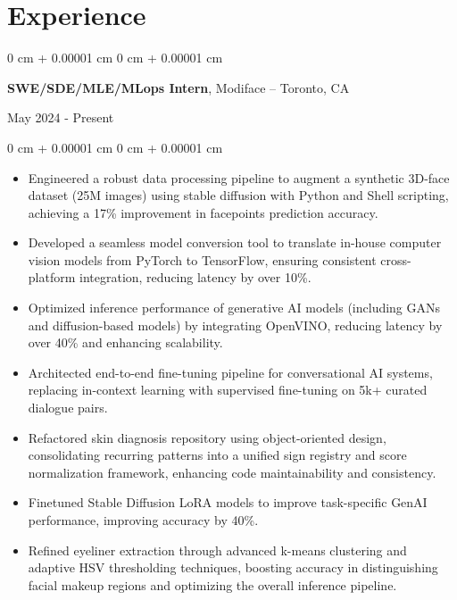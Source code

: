 \documentclass[10pt, letterpaper]{article}
\newenvironment{highlights}{
    \begin{itemize}[
        topsep=0.08 cm,
        parsep=0.08 cm,
        partopsep=0pt,
        itemsep=0pt,
        leftmargin=0.2 cm + 17pt
    ]
}
{
    \end{itemize}
}
\newenvironment{onecolentry}{
    \begin{adjustwidth}{
        0 cm + 0.00001 cm
    }{
        0 cm + 0.00001 cm
    }
}{
    \end{adjustwidth}
}
\newenvironment{twocolentry}[2][]{
    \onecolentry
    \def\secondColumn{#2}
    \setcolumnwidth{\fill, 4.5 cm}
    \begin{paracol}{2}
}{
    \switchcolumn \raggedleft \secondColumn
    \end{paracol}
    \endonecolentry
}
\begin{document}
\section{Experience}
\vspace{0.08 cm}
\begin{twocolentry}{May 2024 - Present}
    {\textbf{SWE/SDE/MLE/MLops Intern}}, Modiface -- Toronto, CA
\end{twocolentry}
\vspace{0.05 cm}
\begin{onecolentry}
    \begin{highlights}
        \item Engineered a robust data processing pipeline to augment a synthetic 3D-face dataset (25M images) using stable diffusion with Python and Shell scripting, achieving a 17\% improvement in facepoints prediction accuracy.
        \item Developed a seamless model conversion tool to translate in-house computer vision models from PyTorch to TensorFlow, ensuring consistent cross-platform integration, reducing latency by over 10\%.
        \item Optimized inference performance of generative AI models (including GANs and diffusion-based models) by integrating OpenVINO, reducing latency by over 40\% and enhancing scalability.
        \item Architected end-to-end fine-tuning pipeline for conversational AI systems, replacing in-context learning with supervised fine-tuning on 5k+ curated dialogue pairs.
        \item Refactored skin diagnosis repository using object-oriented design, consolidating recurring patterns into a unified sign registry and score normalization framework, enhancing code maintainability and consistency.
        \item Finetuned Stable Diffusion LoRA models to improve task-specific GenAI performance, improving accuracy by 40\%.
        \item Refined eyeliner extraction through advanced k-means clustering and adaptive HSV thresholding techniques, boosting accuracy in distinguishing facial makeup regions and optimizing the overall inference pipeline.
    \end{highlights}
\end{onecolentry}
\vspace{0.35 cm}
\end{document}
